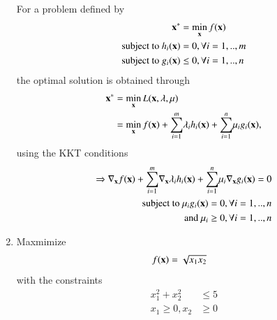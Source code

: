 \begin{enumerate}[label=\arabic*.,ref=\thesubsection.\theenumi]
\solution For a problem defined by 
\begin{align}
\mathbf{x^*} &= \min_{\mathbf{x}}f(\mathbf{x})
\\
\text{subject to } h_i(\mathbf{x}) &= 0, \forall i=1,..,m
\\
\text{subject to } g_i(\mathbf{x}) &\le 0, \forall i=1,..,n
\end{align}
%
the optimal solution is obtained through
%
\begin{align}
\mathbf{x^*} &= \min_{\mathbf{x}}L(\mathbf{x}, \mathbf{\lambda}, \mathbf{\mu}) 
\\
&= \min_{\mathbf{x}}f(\mathbf{x})  + \underset{i=1}{\overset{m}{\sum}} \lambda_i h_i(\mathbf{x}) + \underset{i=1}{\overset{n}{\sum}} \mu_i g_i(\mathbf{x}),
\end{align}
%
using the KKT conditions
%
\begin{align}
\Rightarrow \nabla_\mathbf{x} f(\mathbf{x})  + \underset{i=1}{\overset{m}{\sum}} \nabla_\mathbf{x} \lambda_i h_i(\mathbf{x}) + \underset{i=1}{\overset{n}{\sum}} \mu_i \nabla_\mathbf{x} g_i(\mathbf{x}) = 0 
\\
\text{subject to }\mu_i g_i(\mathbf{x}) = 0, \forall i = 1,..,n
\\
\text{and }\mu_i \ge 0, \forall i = 1,..,n
\end{align}
%
%
\item
	Maxmimize 
	\begin{align}
	f(\mathbf{x}) &= \sqrt{x_1x_2}
	\end{align}
	with the constraints
	\begin{align}
	x_1^2+x_2^2 &\leq 5 \\
	x_1 \geq 0, x_2 &\geq 0
	\end{align}
\end{enumerate}

